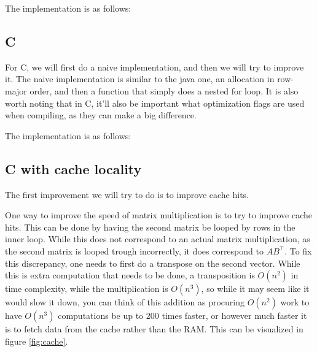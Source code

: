 \documentclass{article}
\begin{document}
The implementation is as follows:

\subsection{C}

For C, we will first do a naive implementation, and then we will try to improve it.
The naive implementation is similar to the java one, an allocation in row-major order, and then a function that simply does a nested for loop.
It is also worth noting that in C, it'll also be important what optimization flags are used when compiling, as they can make a big difference.

The implementation is as follows:

\newpage

\subsection{C with cache locality}

The first improvement we will try to do is to improve cache hits.

One way to improve the speed of matrix multiplication is to try to improve cache hits.
This can be done by having the second matrix be looped by rows in the inner loop.
While this does not correspond to an actual matrix multiplication, as the second matrix is looped trough incorrectly, it does
correspond to $AB^\top$. To fix this discrepancy, one needs to first do a transpose on the second vector.
While this is extra computation that needs to be done, a transposition is $O(n^2)$ in time complexity, while the multiplication
is $O(n^3)$, so while it may seem like it would slow it down, you can think of this addition as procuring $O(n^2)$ work to have
$O(n^3)$ computations be up to $200$ times faster, or however much faster it is to fetch data from the cache rather than the RAM.
This can be visualized in figure \ref{fig:cache}.
\end{document}

